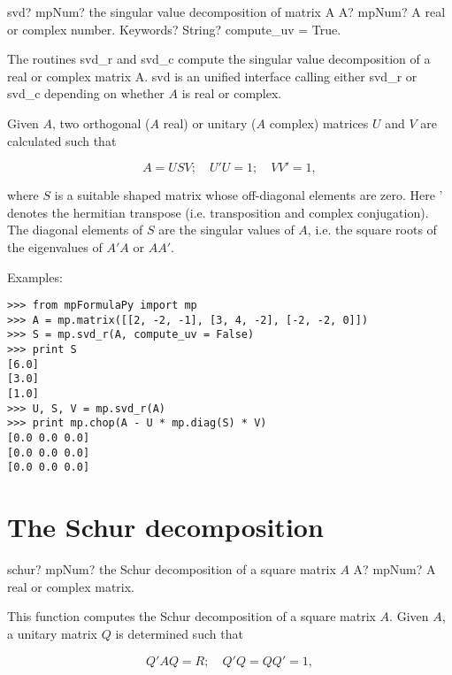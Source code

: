 \begin{mpFunctionsExtract}
	\mpFunctionTwo
	{svd? mpNum? the singular value decomposition of matrix A}
	{A? mpNum? A real or complex number.}
	{Keywords? String? compute\_uv = True.}	
\end{mpFunctionsExtract}

\vpara
The routines svd\_r and svd\_c compute the singular value decomposition of a real or complex matrix A. svd is an unified interface calling either svd\_r or svd\_c depending on whether $A$ is real or complex.

Given $A$, two orthogonal ($A$ real) or unitary ($A$ complex) matrices $U$ and $V$ are calculated such that

\begin{equation}
A=USV; \quad U'U=1; \quad VV'=1,
\end{equation}

where $S$ is a suitable shaped matrix whose off-diagonal elements are zero. Here ' denotes the hermitian transpose (i.e. transposition and complex conjugation). The diagonal elements of $S$ are the singular values of $A$, i.e. the square roots of the eigenvalues of $A'A$ or $AA'$.

Examples:

\begin{lstlisting}
>>> from mpFormulaPy import mp
>>> A = mp.matrix([[2, -2, -1], [3, 4, -2], [-2, -2, 0]])
>>> S = mp.svd_r(A, compute_uv = False)
>>> print S
[6.0]
[3.0]
[1.0]
>>> U, S, V = mp.svd_r(A)
>>> print mp.chop(A - U * mp.diag(S) * V)
[0.0 0.0 0.0]
[0.0 0.0 0.0]
[0.0 0.0 0.0]
\end{lstlisting}





\newpage
\section{The Schur decomposition}


\begin{mpFunctionsExtract}
	\mpFunctionOne
	{schur? mpNum? the Schur decomposition of a square matrix $A$}
	{A? mpNum? A real or complex matrix.}	
\end{mpFunctionsExtract}


\vpara
This function computes the Schur decomposition of a square matrix $A$. Given $A$, a unitary matrix $Q$ is determined such that

\begin{equation}
Q'AQ=R; \quad Q'Q=QQ'=1,
\end{equation}

